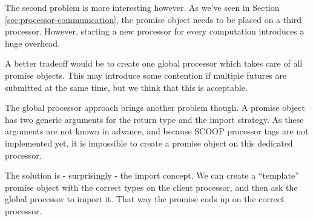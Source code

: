 The second problem is more interesting however.
As we've seen in Section \ref{sec:processor-communication}, the promise object needs to be placed on a third processor.
However, starting a new processor for every computation introduces a huge overhead.

A better tradeoff would be to create one global processor which takes care of all promise objects.
This may introduce some contention if multiple futures are submitted at the same time, but we think that this is acceptable.

The global processor approach brings another problem though.
A promise object has two generic arguments for the return type and the import strategy.
As these arguments are not known in advance, and because SCOOP processor tags \cite[p. 90]{Nienaltowski07} are not implemented yet, it is impossible to create a promise object on this dedicated processor.

The solution is - surprisingly - the import concept.
We can create a ``template'' promise object with the correct types on the client processor, and then ask the global processor to import it.
That way the promise ends up on the correct processor.
